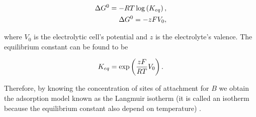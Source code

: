 \begin{align}
	\Delta G^0 = -RT \log\left({K_{eq}}\right), \\
	\Delta G^0 = -zF V_0,
\end{align}

where $V_0$ is the electrolytic cell's potential and $z$ is the electrolyte's valence. The equilibrium constant can be found to be

\begin{align}
	K_{eq} = \exp\left({\frac{zF}{RT}V_0}\right).
\end{align}

Therefore, by knowing the concentration of sites of attachment for $B$ we obtain the adsorption model known as the Langmuir isotherm (it is called an isotherm because the equilibrium constant also depend on temperature) \cite{langmuir}.





